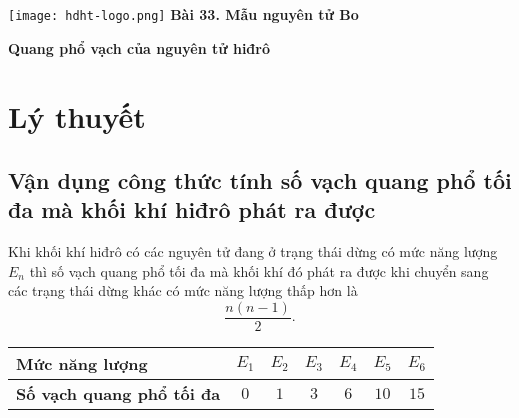\newcommand{\chapter}[2][]{
	\newcommand{\chapname}{#2}
	\begin{flushleft}
		\begin{minipage}[t]{\linewidth}
			\texttt{[image: hdht-logo.png]}
			\hspace{0pt}	
			\sffamily\bfseries\large Bài  33. Mẫu nguyên tử Bo
			\begin{flushleft}
				\huge\bfseries #1
			\end{flushleft}
		\end{minipage}
	\end{flushleft}
	\vspace{1cm}
	\normalfont\normalsize
}
\chapter[Quang phổ vạch của nguyên tử hiđrô]{Quang phổ vạch của nguyên tử hiđrô}

\section{Lý thuyết}

\subsection{Vận dụng công thức tính số vạch quang phổ tối đa mà khối khí hiđrô phát ra được}

	Khi khối khí hiđrô có các nguyên tử đang ở trạng thái dừng có mức năng lượng $E_n$ thì số vạch quang phổ tối đa mà khối khí đó phát ra được khi chuyển sang các trạng thái dừng khác có mức năng lượng thấp hơn là
	\begin{equation}
		\dfrac{n(n-1)}{2}.
	\end{equation}

\begin{center}
	\begin{tabular}{|m{15em}|c|c|c|c|c|c|}
		\hline
		\textbf{Mức năng lượng} 
		&$E_1$
		&$E_2$
		&$E_3$
		&$E_4$
		&$E_5$
		&$E_6$
		\\ \hline
		\textbf{Số vạch quang phổ tối đa}
		& $0$ 
		& $1$ 
		& $3$ 
		& $6$ 
		& $10$ 
		& $15$ 
		\\ \hline
	\end{tabular}
\end{center}

